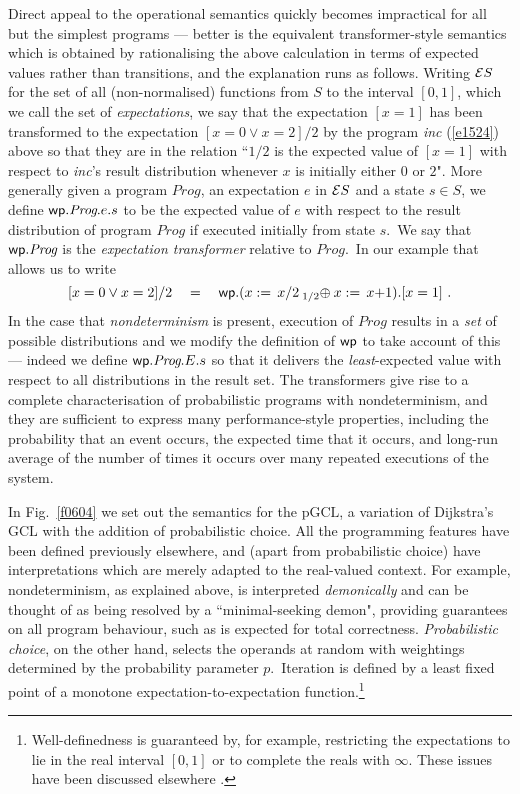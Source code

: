 \documentclass[numbers,copyright,creativecommons]{eptcs}
\newcommand{\figg}[1]{Fig.~\ref{#1}}
\newcommand{\Gets}{:=\,}
\newcommand{\PC}[1]{\mathbin{\makebox[0em]{~}_{#1}\oplus}}
\newcommand{\prog}{\textit{Prog}}
\newcommand{\pGCL}{\mbox{pGCL}}
\newcommand{\GCL}{\mbox{GCL}}
\newcommand{\Wide}[1]{~~~#1~~~}
\begin{document}
Direct appeal to the operational semantics quickly becomes
impractical for all but the simplest programs --- better is the equivalent transformer-style semantics which is
obtained by
rationalising the above calculation in terms of expected values rather than transitions, and the explanation
runs as follows.  Writing ${\cal E} S$ for the set of all (non-normalised) functions from $S$ to the interval $[0,1]$,
which we call the set of \emph{expectations}, we say that
the expectation $[x=1]$ has been transformed to the expectation $[x=0 \lor x=2]/2$
 by the program \textit{inc} (\ref{e1524}) above so that they are in the relation
 ``$1/2$ is the
 expected value of $[x=1]$ with respect to \textit{inc}'s result distribution whenever $x$ is initially either $0$ or $2$".
More generally given a program $\prog$, an expectation $e$ in ${\cal E} S$ and a state $s \in S$,
we define ${\sf wp}.\prog.e.s$ to be the expected value of $e$ with respect to the
result distribution of program $\prog$ if executed initially from state $s$.\ We say that ${\sf wp}.\prog$ is the \emph{expectation transformer} relative to $\prog$.\ In our example that allows us to write
 \[
 [x=0 \lor x=2]/2 \Wide{=} {\sf wp}.(x \Gets x/2 \PC{1/2} x \Gets x{+}1).[x=1]~.
 \]
In the case that
\emph{nondeterminism} is present,  execution of $\prog$ results in a \emph{set}
of possible distributions and we modify the definition
of ${\sf wp}$ to take account of this --- indeed we define ${\sf wp}.\prog.E.s$
so that it  delivers the
\emph{least}-expected value with respect to all distributions in the result set.
The transformers \cite{ARP} give rise to a complete characterisation
of probabilistic programs with nondeterminism, and they are sufficient to
express many performance-style properties, including the probability that an event
occurs, the expected time that it occurs, and long-run
average of the number of times it occurs over many repeated executions of the system.





In \figg{f0604} we set out the semantics for the $\pGCL$, a variation of Dijkstra's
$\GCL$ with the addition of  probabilistic choice.  All the programming
 features have been defined previously
elsewhere, and (apart from probabilistic choice) have interpretations which are merely
adapted to the real-valued context. For example,
nondeterminism, as explained above, is interpreted \emph{demonically}
and  can be thought of as being resolved by a ``minimal-seeking demon",
providing
guarantees on all program behaviour, such as is expected for total correctness.
 \emph{Probabilistic choice}, on the other hand, selects the operands
at random with weightings determined by the probability parameter $p$.\ Iteration is defined by a least fixed point of a monotone expectation-to-expectation function.\footnote{Well-definedness is guaranteed by, for example, restricting the expectations to lie in the real interval $[0,1]$ or to complete the reals with $\infty$. These issues have been discussed elsewhere \cite{ARP}.}
\end{document}
